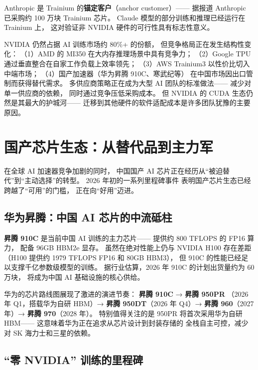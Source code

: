 Anthropic 是 Trainium 的\textbf{锚定客户}（anchor customer）——
据报道 Anthropic 已采购约 100 万块 Trainium 芯片。
Claude 模型的部分训练和推理已经运行在 Trainium 上，
这对验证非 NVIDIA 硬件的可行性具有标志性意义。

\begin{keybox}[AI 加速器的竞争格局（2026 年）]
NVIDIA 仍然占据 AI 训练市场约 80\%+ 的份额，
但竞争格局正在发生结构性变化：
（1）AMD 的 MI350 在大内存推理场景中具有竞争力；
（2）Google TPU 通过垂直整合在自家工作负载上效率领先；
（3）AWS Trainium3 以性价比切入中端市场；
（4）国产加速器（华为昇腾 910C、寒武纪等）
在中国市场因出口管制而获得替代需求。
多供应商策略正在成为大型 AI 团队的标准做法——
减少对单一供应商的依赖，
同时通过竞争压低采购成本。
但 NVIDIA 的 CUDA 生态仍然是其最大的护城河——
迁移到其他硬件的软件适配成本是许多团队犹豫的主要原因。
\end{keybox}

\section{国产芯片生态：从替代品到主力军}
\label{sec:domestic-chips}

在全球 AI 加速器竞争加剧的同时，
中国国产 AI 芯片正在经历从``被迫替代''到``主动选择''的转型。
2026 年初的一系列里程碑事件
表明国产芯片生态已经跨越了``可用''的门槛，
正在向``好用''迈进。

\subsection{华为昇腾：中国 AI 芯片的中流砥柱}

\textbf{昇腾 910C}
是当前中国 AI 训练的主力芯片——
提供约 800 TFLOPS 的 FP16 算力，
配备 96GB HBM2e 显存。
虽然在绝对性能上仍与 NVIDIA H100 存在差距
（H100 提供约 1979 TFLOPS FP16 和 80GB HBM3），
但 910C 的性能已经足以支撑千亿参数级模型的训练。
据行业估算，2026 年 910C 的计划出货量约为 60 万块，
将成为中国 AI 基础设施的核心供给。

华为的芯片路线图展现了激进的演进节奏：
\textbf{昇腾 910C} → \textbf{昇腾 950PR}
（2026 年 Q1，搭载华为自研 HBM）→
\textbf{昇腾 950DT}（2026 年 Q4）→
\textbf{昇腾 960}（2027 年）→
\textbf{昇腾 970}（2028 年）。
特别值得关注的是 950PR 将首次采用华为自研 HBM——
这意味着华为正在追求从芯片设计到封装存储的
全栈自主可控，减少对 SK 海力士和三星的依赖。

\subsection{``零 NVIDIA'' 训练的里程碑}


